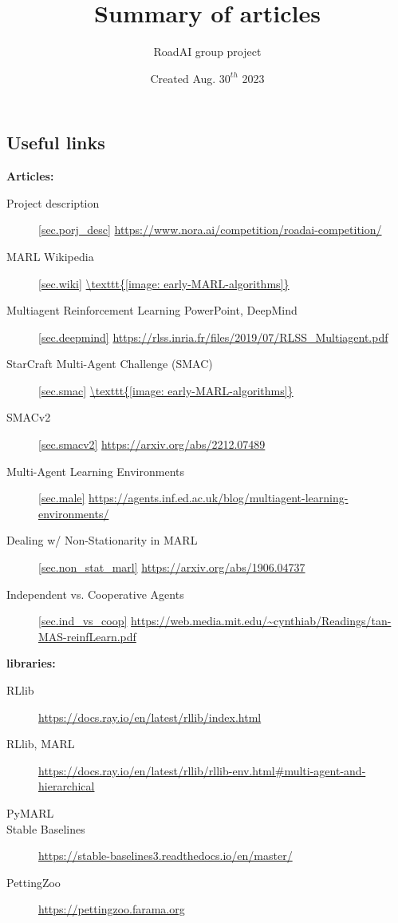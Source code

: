 \documentclass{article}
\title{Summary of articles}
\author{RoadAI group project}
\date{Created Aug. $30^{th}$ 2023}
\begin{document}
\begin{titlepage}
\maketitle
\end{titlepage}

\subsection*{Useful links}    \label{sec.links}
\textbf{Articles:}
\begin{description}
  \item[Project description]\ref{sec.porj_desc} \url{https://www.nora.ai/competition/roadai-competition/}
  \item[MARL Wikipedia]\ref{sec.wiki} \url{\texttt{[image: early-MARL-algorithms]}}
  \item[Multiagent Reinforcement Learning PowerPoint, DeepMind]\ref{sec.deepmind} \url{https://rlss.inria.fr/files/2019/07/RLSS_Multiagent.pdf}
  \item[StarCraft Multi-Agent Challenge (SMAC)]\ref{sec.smac} \url{\texttt{[image: early-MARL-algorithms]}}
  \item[SMACv2]\ref{sec.smacv2} \url{https://arxiv.org/abs/2212.07489}
  \item[Multi-Agent Learning Environments]\ref{sec.male} \url{https://agents.inf.ed.ac.uk/blog/multiagent-learning-environments/}
  \item[Dealing w/ Non-Stationarity in MARL] \ref{sec.non_stat_marl} \url{https://arxiv.org/abs/1906.04737}
  \item[Independent vs. Cooperative Agents] \ref{sec.ind_vs_coop} \url{https://web.media.mit.edu/~cynthiab/Readings/tan-MAS-reinfLearn.pdf}
\end{description}

\noindent
\textbf{libraries:}
\begin{description}
  \item[RLlib] \url{https://docs.ray.io/en/latest/rllib/index.html}
  \item[RLlib, MARL] \url{https://docs.ray.io/en/latest/rllib/rllib-env.html#multi-agent-and-hierarchical}
  \item[PyMARL]
  \item[Stable Baselines] \url{https://stable-baselines3.readthedocs.io/en/master/}
  \item[PettingZoo] \url{https://pettingzoo.farama.org}
\end{description}
\end{document}
